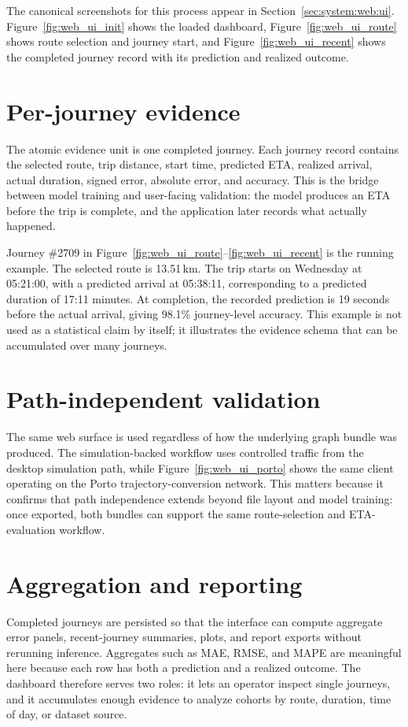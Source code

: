 The canonical screenshots for this process appear in Section~\ref{sec:system:web:ui}. Figure~\ref{fig:web_ui_init} shows the loaded dashboard, Figure~\ref{fig:web_ui_route} shows route selection and journey start, and Figure~\ref{fig:web_ui_recent} shows the completed journey record with its prediction and realized outcome.

\section{Per-journey evidence}
The atomic evidence unit is one completed journey. Each journey record contains the selected route, trip distance, start time, predicted ETA, realized arrival, actual duration, signed error, absolute error, and accuracy. This is the bridge between model training and user-facing validation: the model produces an ETA before the trip is complete, and the application later records what actually happened.

Journey \#2709 in Figure~\ref{fig:web_ui_route}--\ref{fig:web_ui_recent} is the running example. The selected route is 13.51\,km. The trip starts on Wednesday at 05:21:00, with a predicted arrival at 05:38:11, corresponding to a predicted duration of 17:11 minutes. At completion, the recorded prediction is 19 seconds before the actual arrival, giving 98.1\% journey-level accuracy. This example is not used as a statistical claim by itself; it illustrates the evidence schema that can be accumulated over many journeys.

\section{Path-independent validation}
The same web surface is used regardless of how the underlying graph bundle was produced. The simulation-backed workflow uses controlled traffic from the desktop simulation path, while Figure~\ref{fig:web_ui_porto} shows the same client operating on the Porto trajectory-conversion network. This matters because it confirms that path independence extends beyond file layout and model training: once exported, both bundles can support the same route-selection and ETA-evaluation workflow.

\section{Aggregation and reporting}
Completed journeys are persisted so that the interface can compute aggregate error panels, recent-journey summaries, plots, and report exports without rerunning inference. Aggregates such as MAE, RMSE, and MAPE are meaningful here because each row has both a prediction and a realized outcome. The dashboard therefore serves two roles: it lets an operator inspect single journeys, and it accumulates enough evidence to analyze cohorts by route, duration, time of day, or dataset source.

